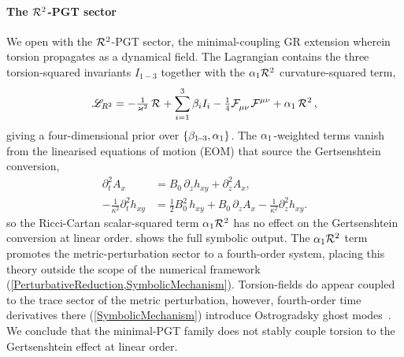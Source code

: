 \paragraph*{The $\MAGF{^2}$-PGT sector}
We open with the $\MAGF{^2}$-PGT sector, the minimal-coupling GR extension
wherein torsion propagates as a dynamical field. The Lagrangian contains the three
torsion-squared invariants $I_{1\!-\!3}$
\cite{shapiro2002torsion,hayashi1979new} together with the
$\Alp{1}\MAGF{^2}$ curvature-squared term,
\begin{align*}
  \lag_{R^2}
    = -\tfrac{1}{\kappa^2}\,\MAGF{}
       + \sum_{i=1}^{3} \Bet{i} I_i
    - \tfrac{1}{4}\FieldF{_{\mu\nu}}\FieldF{^{\mu\nu}}
       + \Alp{1}\,\MAGF{^2} \, ,
\end{align*}
giving a four-dimensional prior over
$\{\beta_{1\!-\!3}, \alpha_{1}\}$. The $\alpha_{1}$-weighted terms vanish
from the linearised equations of motion (EOM) that source the
Gertsenshtein conversion,
\begin{align*}
  \partial_t^2 A_x &= B_0 \, \partial_z h_{xy} + \partial_z^2 A_x, \\
  -\tfrac{1}{\kappa^2} \partial_t^2 h_{xy} &= \tfrac{1}{2} B_0^2 \, h_{xy}
    + B_0 \, \partial_z A_x - \tfrac{1}{\kappa^2} \partial_z^2 h_{xy}.
\end{align*}
so the Ricci-Cartan scalar-squared term $\Alp{1}\MAGF{^2}$ has no
effect on the Gertsenshtein conversion at linear order.
 shows the full symbolic output.
The $\Alp{1}\MAGF{^2}$ term promotes the metric-perturbation
sector to a fourth-order system, placing this theory outside the
scope of the numerical framework
(\cref{PerturbativeReduction,SymbolicMechanism}).
Torsion-fields do appear coupled
to the trace sector of the metric perturbation, however, fourth-order time
derivatives there (\cref{SymbolicMechanism}) introduce Ostrogradsky
ghost modes~\cite{Woodard:2015zca,blagojevic2018hamiltonian,lin2019pgt}.
We conclude that the minimal-PGT family does not stably
couple torsion to the Gertsenshtein effect at linear order.

